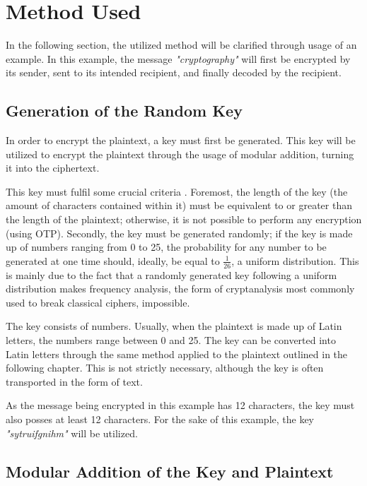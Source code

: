 \documentclass[12pt, a4paper]{report}
\theoremstyle{definition}
\theoremstyle{remark}
\begin{document}
\section{Method Used}
In the following section, the utilized method will be clarified through usage of an example. In this example, the message \textit{"cryptography"} will first be encrypted by its sender, sent to its intended recipient, and finally decoded by the recipient.

\subsection{Generation of the Random Key}
\label{sec::otpkeygen}
In order to encrypt the plaintext, a key must first be generated. This key will be utilized to encrypt the plaintext through the usage of modular addition, turning it into the ciphertext.

This key must fulfil some crucial criteria \cite{MilsElectronic}. Foremost, the length of the key (the amount of  characters contained within it) must be equivalent to or greater than the length of the plaintext; otherwise, it is not possible to perform any encryption (using OTP). Secondly, the key must be generated randomly; if the key is made up of numbers ranging from 0 to 25, the probability for any number to be generated at one time should, ideally, be equal to $\frac{1}{26}$, a uniform distribution. This is mainly due to the fact that a randomly generated key following a uniform distribution makes frequency analysis\cite{FrequencyAnalysis}, the form of cryptanalysis most commonly used to break classical ciphers, impossible.


The key consists of numbers. Usually, when the plaintext is made up of Latin letters, the numbers range between 0 and 25. The key can be converted into Latin letters through the same method applied to the plaintext outlined in the following chapter. This is not strictly necessary, although the key is often transported in the form of text.

As the message being encrypted in this example has 12 characters, the key must also posses at least 12 characters. For the sake of this example, the key \textit{"sytruifgnihm"} will be utilized.

\subsection{Modular Addition of the Key and Plaintext}
\end{document}
